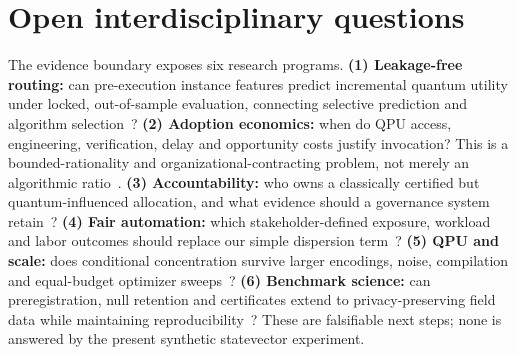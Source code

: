 \section{Open interdisciplinary questions}
\label{sec:agenda}



The evidence boundary exposes six research programs. \textbf{(1) Leakage-free routing:} can pre-execution instance features predict incremental quantum utility under locked, out-of-sample evaluation, connecting selective prediction and algorithm selection~\citep{geifman2017selective,rice1976algorithm,kotthoff2014algorithm}? \textbf{(2) Adoption economics:} when do QPU access, engineering, verification, delay and opportunity costs justify invocation? This is a bounded-rationality and organizational-contracting problem, not merely an algorithmic ratio~\citep{simon1955behavioral,hart1990property}. \textbf{(3) Accountability:} who owns a classically certified but quantum-influenced allocation, and what evidence should a governance system retain~\citep{nist2023airmf,iso42001}? \textbf{(4) Fair automation:} which stakeholder-defined exposure, workload and labor outcomes should replace our simple dispersion term~\citep{selbst2019fairness,bai2022algorithmic}? \textbf{(5) QPU and scale:} does conditional concentration survive larger encodings, noise, compilation and equal-budget optimizer sweeps~\citep{preskill2018nisq,bharti2022nisq}? \textbf{(6) Benchmark science:} can preregistration, null retention and certificates extend to privacy-preserving field data while maintaining reproducibility~\citep{pineau2021reproducibility}? These are falsifiable next steps; none is answered by the present synthetic statevector experiment.

